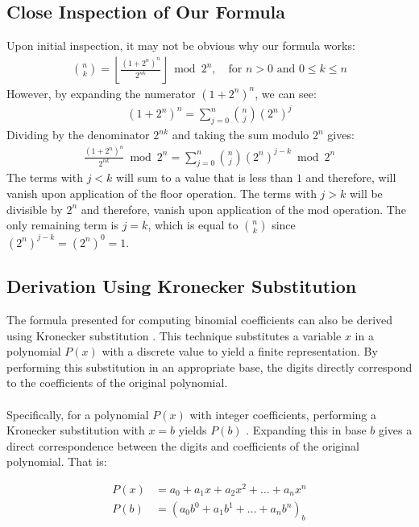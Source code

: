 \documentclass{article}
\theoremstyle{plain}
\theoremstyle{definition}
\begin{document}
\subsection{Close Inspection of Our Formula}
Upon initial inspection, it may not be obvious why our formula works:
\begin{align*}
\binom{n}{k} = \left\lfloor\frac{(1 + 2^{n})^{n}}{2^{n k}}\right\rfloor \bmod{2^{n}}, \quad \text{for } n > 0 \text{ and } 0 \leq k \leq n
\end{align*}
However, by expanding the numerator $(1 + 2^{n})^{n}$, we can see:
\begin{align}
(1 + 2^{n})^{n} = \sum_{j=0}^{n} \binom{n}{j} (2^n)^{j}
\end{align}
Dividing by the denominator $2^{n k}$ and taking the sum modulo $2^n$ gives:
\begin{align}
\frac{(1 + 2^{n})^{n}}{2^{n k}} \bmod{2^n} = \sum_{j=0}^{n} \binom{n}{j} (2^n)^{j-k} \bmod{2^n}
\end{align}
The terms with $j < k$ will sum to a value that is less than $1$ and therefore, will vanish upon application of the floor operation. The terms with $j > k$ will be divisible by $2^n$ and therefore, vanish upon application of the mod operation. The only remaining term is $j = k$, which is equal to $\binom{n}{k}$ since $(2^n)^{j-k} = (2^n)^0 = 1$.

\subsection{Derivation Using Kronecker Substitution}

The formula presented for computing binomial coefficients can also be derived using Kronecker substitution \cite{grimaldi2004discrete}. This technique substitutes a variable $x$ in a polynomial $P(x)$ with a discrete value to yield a finite representation. By performing this substitution in an appropriate base, the digits directly correspond to the coefficients of the original polynomial.
\\
\\
Specifically, for a polynomial $P(x)$ with integer coefficients, performing a Kronecker substitution with $x = b$ yields $P(b)$ \cite{grimaldi2004discrete}. Expanding this in base $b$ gives a direct correspondence between the digits and coefficients of the original polynomial. That is:

\begin{align}
P(x) &= a_0 + a_1 x + a_2 x^2 + \ldots + a_n x^n \\
P(b) &= (a_0 b^0 + a_1 b^1 + \ldots + a_n b^n)_b
\end{align}
\end{document}

